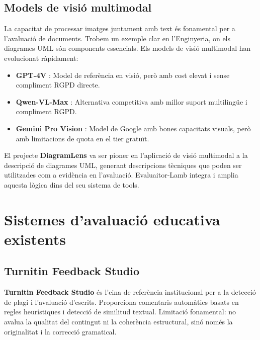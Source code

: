\documentclass[12pt,a4paper,twoside]{report}
\begin{document}
\subsection{Models de visi\'o multimodal}
\label{subsec:models-visio}

La capacitat de processar imatges juntament amb text \'es fonamental per a l'avaluaci\'o de documents. Trobem un exemple clar en l'Enginyeria, on els diagrames UML s\'on components essencials. Els models de visi\'o multimodal han evolucionat r\`apidament:

\begin{itemize}
    \item \textbf{GPT-4V} \cite{openai2024}: Model de refer\`encia en visi\'o, per\`o amb cost elevat i sense compliment RGPD directe.
    \item \textbf{Qwen-VL-Max} \cite{qwen2024}: Alternativa competitiva amb millor suport multiling\"ue i compliment RGPD.
    \item \textbf{Gemini Pro Vision} \cite{gemini2024}: Model de Google amb bones capacitats visuals, per\`o amb limitacions de quota en el tier gratu\"it.
\end{itemize}

El projecte \textbf{DiagramLens} \cite{diagramlens} va ser pioner en l'aplicaci\'o de visi\'o multimodal a la descripci\'o de diagrames UML, generant descripcions t\`ecniques que poden ser utilitzades com a evid\`encia en l'avaluaci\'o. Evaluaitor-Lamb integra i amplia aquesta l\`ogica dins del seu sistema de tools.

\section{Sistemes d'avaluaci\'o educativa existents}
\label{sec:sistemes-existents}

\subsection{Turnitin Feedback Studio}
\label{subsec:turnitin}

\textbf{Turnitin Feedback Studio} \cite{turnitin} \'es l'eina de refer\`encia institucional per a la detecci\'o de plagi i l'avaluaci\'o d'escrits. Proporciona comentaris autom\`atics basats en regles heur\'istiques i detecci\'o de similitud textual. Limitaci\'o fonamental: no avalua la qualitat del contingut ni la coher\`encia estructural, sin\'o nom\'es la originalitat i la correcci\'o gramatical.
\end{document}
